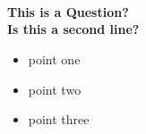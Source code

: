 \documentclass{article}
\begin{document}
    \pagestyle{empty}   
    \noindent
    
    \tiny   
    \tableofcontents  
    \normalsize
    \newpage
    ~ \newpage

    \section[erste Frage]{}
   
    \vfill
    \begin{center}
            \LARGE \textbf{
            This is a Question?\\
            Is this a second line?\\ 
        }
    \end{center}
    \vfill
    \mbox{}
   
   \newpage

   \begin{itemize}
       \item point one
       \item point two
       \item point three
   \end{itemize}
 
\end{document}
